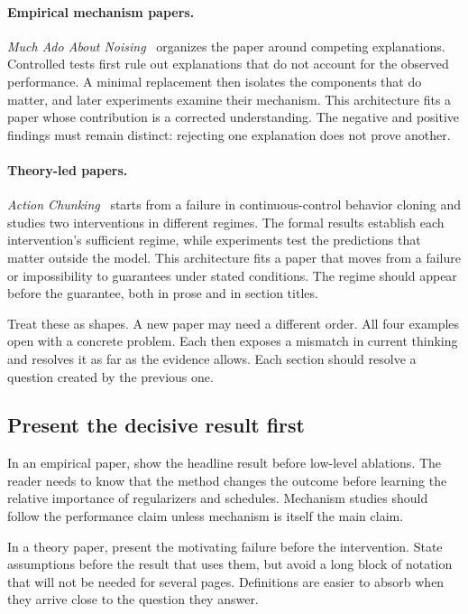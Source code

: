 \paragraph{Empirical mechanism papers.}
\emph{Much Ado About Noising}~\citep{pan2025muchado} organizes the paper
around competing explanations. Controlled tests first rule out explanations
that do not account for the observed performance. A minimal replacement then
isolates the components that do matter, and later experiments examine their
mechanism. This architecture fits a paper whose contribution is a corrected
understanding. The negative and positive findings must remain distinct:
rejecting one explanation does not prove another.

\paragraph{Theory-led papers.}
\emph{Action Chunking}~\citep{zhang2025actionchunking} starts from a failure
in continuous-control behavior cloning and studies two interventions in
different regimes. The formal results establish each intervention's sufficient
regime, while experiments test the predictions that matter outside the
model. This architecture fits a paper that moves from a failure or
impossibility to guarantees under stated conditions. The regime should appear
before the guarantee, both in prose and in section titles.

Treat these as shapes. A new paper may need a different order. All four
examples open with a concrete problem. Each then exposes a mismatch in current
thinking and resolves it as far as the evidence allows. Each section should
resolve a question created by the previous one.

\subsection{Present the decisive result first}

In an empirical paper, show the headline result before low-level ablations.
The reader needs to know that the method changes the outcome before learning
the relative importance of regularizers and schedules. Mechanism studies
should follow the performance claim unless mechanism is itself the main claim.

In a theory paper, present the motivating failure before the intervention.
State assumptions before the result that uses them, but avoid a long block of
notation that will not be needed for several pages. Definitions are
easier to absorb when they arrive close to the question they answer.

